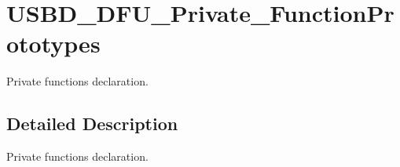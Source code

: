\hypertarget{group__USBD__DFU__Private__FunctionPrototypes}{}\section{U\+S\+B\+D\+\_\+\+D\+F\+U\+\_\+\+Private\+\_\+\+Function\+Prototypes}
\label{group__USBD__DFU__Private__FunctionPrototypes}


Private functions declaration.  




\subsection{Detailed Description}
Private functions declaration. 


